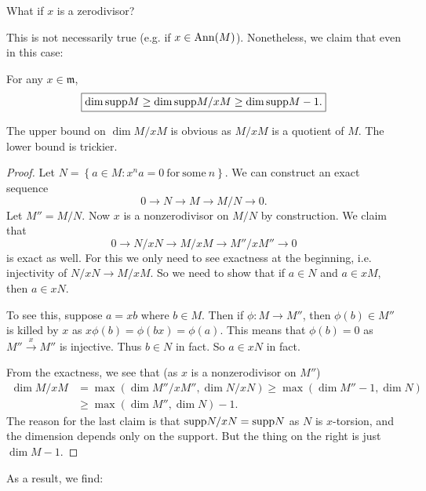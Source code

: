 \begin{question} 
What if $x$ is  a zerodivisor? 
\end{question} 

This is not necessarily true (e.g. if $x \in \mathrm{Ann}(M)$). Nonetheless, we claim
that even in this case:
\begin{proposition} 
For any $x \in \mathfrak{m}$,
\[ \boxed{ \dim \mathrm{supp} M \geq \dim \mathrm{supp} M/xM \geq \dim \mathrm{supp} M -1 .}\]
\end{proposition} 
The upper bound on $\dim M/xM$ is obvious as $M/xM$ is a quotient of $M$. The
lower bound is trickier. 

\begin{proof} 
Let $N = \left\{a \in M: x^n a = 0 \ \mathrm{for \ some \ } n \right\}$. We can
construct an exact sequence
\[ 0 \to N \to M \to M/N \to 0.  \]
Let $M'' = M/N$.
Now $x$ is a nonzerodivisor on $M/N$ by construction. We claim that 
\[ 0 \to N/xN \to M/xM \to M''/xM'' \to 0  \]
is exact as well. For this we only need to see exactness at the beginning,
i.e. injectivity of $N/xN \to M/xM$. So
we need to show that if $a \in N$ and $a \in xM$, then $a \in x N$.

To see this, suppose $a = xb$ where $b \in M$. Then if $\phi: M \to M''$, then
$\phi(b) \in M''$ is killed by $x$ as $x \phi(b) = \phi(bx) = \phi(a)$.
This means that $\phi(b)=0$ as $M'' \stackrel{x}{\to} M''$ is injective. Thus
$b \in N$ in fact. So $a \in xN$ in fact.

From the exactness, we see that (as $x$ is a nonzerodivisor on $M''$)
\begin{align*} \dim M/xM & = \max (\dim M''/xM'', \dim N/xN) \geq \max(\dim M'' -1, \dim
N)\\ &  \geq \max( \dim M'', \dim N)-1  .  \end{align*}
The reason for the last claim is that $\mathrm{supp} N/xN = \mathrm{supp} N$ as $N$ is
$x$-torsion, and the dimension depends only on the support. But the thing on the right is just $\dim M -1$. 
\end{proof} 

As a result, we find:

